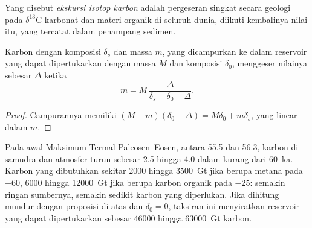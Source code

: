 \begin{definition}\label{def:b3:stable-isotopes:cie}
Yang disebut \emph{ekskursi isotop karbon} adalah
pergeseran singkat secara geologi pada $\delta^{13}\mathrm C$ karbonat dan
materi organik di seluruh dunia, diikuti kembalinya nilai itu, yang tercatat dalam penampang sedimen.
\end{definition}

\begin{proposition}\label{prop:b3:stable-isotopes:cie-mass}
Karbon dengan komposisi $\delta_s$ dan massa $m$, yang dicampurkan ke dalam
reservoir yang dapat dipertukarkan dengan massa $M$ dan komposisi $\delta_0$, menggeser nilainya sebesar $\Delta$ ketika
\[
m = M\,\frac{\Delta}{\delta_s - \delta_0 - \Delta}.
\]
\end{proposition}

\begin{proof}
Campurannya memiliki $(M + m)(\delta_0 + \Delta) = M\delta_0 + m\delta_s$, yang linear dalam
$m$.
\end{proof}

Pada awal Maksimum Termal Paleosen--Eosen, antara 55.5 dan
\qty{56.3}{\Ma}, karbon di samudra dan atmosfer turun sebesar 2.5 hingga
\qty{4.0}{\permil} dalam kurang dari \qty{60}{ka}. Karbon yang dibutuhkan sekitar
2000 hingga \qty{3500}{Gt} jika berupa metana pada \qty{-60}{\permil}, 6000 hingga
\qty{12000}{Gt} jika berupa karbon organik pada \qty{-25}{\permil}: semakin ringan
sumbernya, semakin sedikit karbon yang diperlukan. Jika dihitung mundur dengan proposisi
di atas dan $\delta_0 = 0$, taksiran ini menyiratkan reservoir yang dapat dipertukarkan sebesar \num{46000}
hingga \qty{63000}{Gt} karbon.

